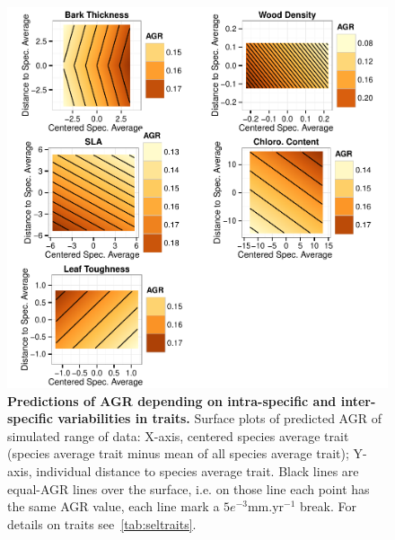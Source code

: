 \begin{figure}[!tb]
	\centering
	\includegraphics{figures/Sel_Traits_Simul_AGR_2015-05-28.pdf}
	\caption{\textbf{Predictions of AGR depending on intra-specific and inter-specific variabilities in traits.} Surface plots of predicted AGR of simulated range of data: X-axis, centered species average trait (species average trait minus mean of all species average trait); Y-axis, individual distance to species average trait. Black lines are equal-AGR lines over the surface, i.e. on those line each point has the same AGR value, each line mark a $5e^{-3}\text{mm}.\text{yr}^{-1}$ break. For details on traits see~\autoref{tab:seltraits}.}
	\label{fig:simul}
\end{figure}